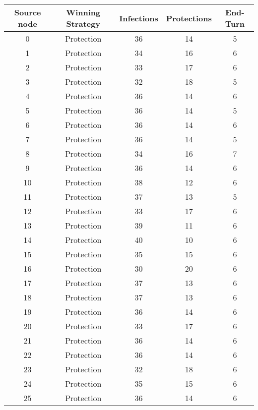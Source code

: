 \documentclass[results.tex]{subfiles}
\begin{document}
\begin{center}
  \begin{tabular}{| c || c | c | c | c |}
    \hline
    {\bfseries Source node} & {\bfseries Winning Strategy} & {\bfseries Infections} & {\bfseries Protections} & {\bfseries End-Turn} \\  %
    \hline\hline
    0 & Protection & 36 & 14 & 5 \\ 
    \hline
    1 & Protection & 34 & 16 & 6 \\ 
    \hline
    2 & Protection & 33 & 17 & 6 \\ 
    \hline
    3 & Protection & 32 & 18 & 5 \\ 
    \hline
    4 & Protection & 36 & 14 & 6 \\ 
    \hline
    5 & Protection & 36 & 14 & 5 \\ 
    \hline
    6 & Protection & 36 & 14 & 6 \\ 
    \hline
    7 & Protection & 36 & 14 & 5 \\ 
    \hline
    8 & Protection & 34 & 16 & 7 \\ 
    \hline
    9 & Protection & 36 & 14 & 6 \\ 
    \hline
    10 & Protection & 38 & 12 & 6 \\ 
    \hline
    11 & Protection & 37 & 13 & 5 \\ 
    \hline
    12 & Protection & 33 & 17 & 6 \\ 
    \hline
    13 & Protection & 39 & 11 & 6 \\ 
    \hline
    14 & Protection & 40 & 10 & 6 \\ 
    \hline
    15 & Protection & 35 & 15 & 6 \\ 
    \hline
    16 & Protection & 30 & 20 & 6 \\ 
    \hline
    17 & Protection & 37 & 13 & 6 \\ 
    \hline
    18 & Protection & 37 & 13 & 6 \\ 
    \hline
    19 & Protection & 36 & 14 & 6 \\ 
    \hline
    20 & Protection & 33 & 17 & 6 \\ 
    \hline
    21 & Protection & 36 & 14 & 6 \\ 
    \hline
    22 & Protection & 36 & 14 & 6 \\ 
    \hline
    23 & Protection & 32 & 18 & 6 \\ 
    \hline
    24 & Protection & 35 & 15 & 6 \\ 
    \hline
    25 & Protection & 36 & 14 & 6 \\ 

\end{tabular}
\end{center}
\end{document}
